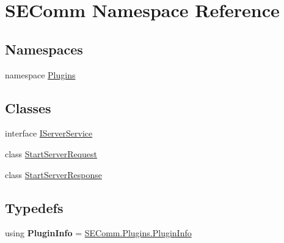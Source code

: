 \hypertarget{namespace_s_e_comm}{}\section{S\+E\+Comm Namespace Reference}
\label{namespace_s_e_comm}
\subsection*{Namespaces}
\begin{DoxyCompactItemize}
\item 
namespace \hyperlink{namespace_s_e_comm_1_1_plugins}{Plugins}
\end{DoxyCompactItemize}
\subsection*{Classes}
\begin{DoxyCompactItemize}
\item 
interface \hyperlink{interface_s_e_comm_1_1_i_server_service}{I\+Server\+Service}
\item 
class \hyperlink{class_s_e_comm_1_1_start_server_request}{Start\+Server\+Request}
\item 
class \hyperlink{class_s_e_comm_1_1_start_server_response}{Start\+Server\+Response}
\end{DoxyCompactItemize}
\subsection*{Typedefs}
\begin{DoxyCompactItemize}
\item 
\hypertarget{namespace_s_e_comm_afeefbff5ab0c95cfd9755a5636156654}{}using {\bfseries Plugin\+Info} = \hyperlink{class_s_e_comm_1_1_plugins_1_1_plugin_info}{S\+E\+Comm.\+Plugins.\+Plugin\+Info}\label{namespace_s_e_comm_afeefbff5ab0c95cfd9755a5636156654}

\end{DoxyCompactItemize}
